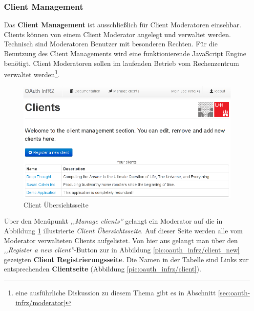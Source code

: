 \documentclass[12pt,a4paper,pointednumbers,abstracton]{scrartcl}
\begin{document}
\subsubsection{Client Management}

Das \textbf{Client Management} ist ausschließlich für Client Moderatoren einsehbar.
Clients können von einem Client Moderator angelegt und verwaltet werden.
Technisch sind Moderatoren Benutzer mit besonderen Rechten.
Für die Benutzung des Client Managements wird eine funktionierende JavaScript Engine benötigt.
Client Moderatoren sollen im laufenden Betrieb vom Rechenzentrum verwaltet werden\footnote{eine ausführliche Diskussion zu diesem Thema gibt es in Abschnitt \ref{sec:oauth-infrz/moderator}}.


\begin{figure}[h!]
\centering
\includegraphics[width=15cm]{img/oauth_infrz/clients_overview}
\caption{Client Übersichtsseite}
\label{pic:oauth_infrz/clients_overview}
\end{figure}

Über den Menüpunkt \emph{,,Manage clients''} gelangt ein Moderator auf die in Abbildung \ref{pic:oauth_infrz/clients_overview} illustrierte \emph{Client Übersichtsseite}.
Auf dieser Seite werden alle vom Moderator verwalteten Clients aufgelistet.
Von hier aus gelangt man über den \emph{,,Register a new client''}-Button zur in Abbildung \ref{pic:oauth_infrz/client_new} gezeigten \textbf{Client Registrierungsseite}.
Die Namen in der Tabelle sind Links zur entsprechenden \textbf{Clientseite} (Abbildung \ref{pic:oauth_infrz/client}).
\end{document}
